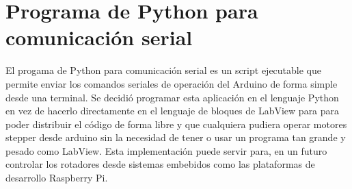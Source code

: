 
\section{Programa de Python para comunicación serial}
\label{sec:python_serial}

El progama de Python para comunicación serial es un script ejecutable
que permite enviar los comandos seriales de operación del Arduino de
forma simple desde una terminal. Se decidió programar esta aplicación
en el lenguaje Python en vez de hacerlo directamente en el lenguaje de
bloques de LabView para para poder distribuir el código de forma libre
y que cualquiera pudiera operar motores stepper desde arduino sin la
necesidad de tener o usar un programa tan grande y pesado como
LabView. Esta implementación puede servir para, en un futuro controlar
los rotadores desde sistemas embebidos como las plataformas de
desarrollo Raspberry Pi.


